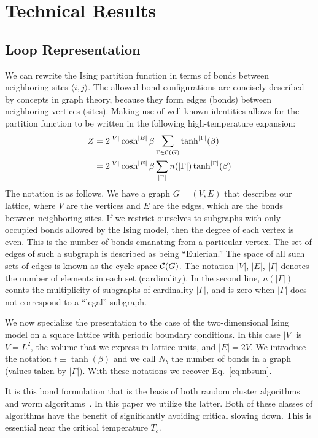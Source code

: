 \documentclass[../main.tex]{subfiles}
\begin{document}
\section{Technical Results}%
\label{sec:technical_results}
\subsection{Loop Representation}%
\label{ssec:loop_representation}
We can rewrite the Ising partition function in terms of bonds between
neighboring sites $\langle i , j \rangle$.
%
The allowed bond configurations are concisely described by concepts in graph
theory, because they form edges (bonds) between neighboring vertices (sites).
%
Making use of well-known identities allows for the partition function to be
written in the following high-temperature expansion:
%
\begin{align}
    Z &= 2^{|V|} \cosh^{|E|} \beta \sum_{\Gamma \in {\cal C}(G)}
			\tanh^{|\Gamma|}(\beta) \\
		&= 2^{|V|} \cosh^{|E|} \beta \sum_{|\Gamma|} n(|\Gamma|)
			\tanh^{|\Gamma|}(\beta)
\label{eq:z}
\end{align}
%
The notation is as follows.
%
We have a graph $G=(V,E)$ that describes our lattice, where $V$ are the
vertices and $E$ are the edges, which are the bonds between neighboring sites.
%
If we restrict ourselves to subgraphs with only occupied bonds allowed by the
Ising model, then the degree of each vertex is even.
%
This is the number of bonds emanating from a particular vertex.
%
The set of edges of such a subgraph is described as being ``Eulerian.''
%
The space of all such sets of edges is known as the cycle space ${\cal C}(G)$.
%
The notation $|V|$, $|E|$, $|\Gamma|$ denotes the number of elements in each
set (cardinality).
%
In the second line, $n(|\Gamma|)$ counts the multiplicity of subgraphs of
cardinality $|\Gamma|$, and is zero when $|\Gamma|$ does not correspond to a
``legal'' subgraph.

We now specialize the presentation to the case of the two-dimensional Ising
model on a square lattice with periodic boundary conditions.
%
In this case $|V|$ is $V=L^2$, the volume that we express in lattice units, and
$|E| = 2V$.
%
We introduce the notation $t\equiv\tanh(\beta)$ and we call $N_b$ the number of
bonds in a graph (values taken by $|\Gamma|$).
%
With these notations we recover Eq.~\ref{eq:nbsum}.

It is this bond formulation that is the basis of both random cluster
algorithms~\cite{Swendsen:1987ce} and worm algorithms~\cite{prok87}.
%
In this paper we utilize the latter.
%
Both of these classes of algorithms have the benefit of significantly avoiding
critical slowing down.
%
This is essential near the critical temperature $T_c$.
\end{document}
